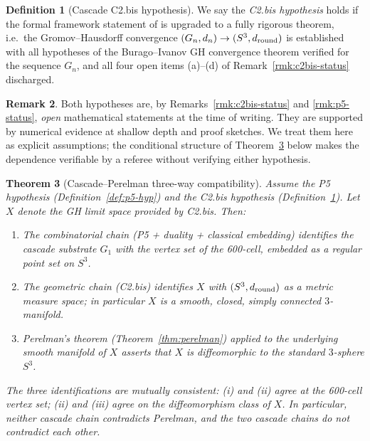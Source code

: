 \documentclass[11pt, a4paper]{amsart}
\newtheorem{theorem}{Theorem}[section]
\theoremstyle{definition}
\newtheorem{definition}[theorem]{Definition}
\newtheorem{remark}[theorem]{Remark}
\begin{document}
\begin{definition}[Cascade C2.bis hypothesis]
\label{def:c2bis-hyp}
We say the \emph{C2.bis hypothesis} holds if the formal framework
statement of \cite[\S C2.bis.1]{CascadeGR} is upgraded to a fully
rigorous theorem, i.e.\ the Gromov--Hausdorff convergence
$(G_{n}, d_{n}) \to (S^{3}, d_{\rm round})$ is established with all
hypotheses of the Burago--Ivanov GH convergence theorem
\cite{BuragoBuragoIvanov} verified for the sequence $G_{n}$, and
all four open items (a)--(d) of Remark~\ref{rmk:c2bis-status}
discharged.
\end{definition}

\begin{remark}
Both hypotheses are, by Remarks~\ref{rmk:c2bis-status} and
\ref{rmk:p5-status}, \emph{open} mathematical statements at the
time of writing. They are supported by numerical evidence at
shallow depth and proof sketches. We treat them here as explicit
assumptions; the conditional structure of
Theorem~\ref{thm:compatibility} below makes the dependence
verifiable by a referee without verifying either hypothesis.
\end{remark}

\begin{theorem}[Cascade--Perelman three-way compatibility]
\label{thm:compatibility}
Assume the P5 hypothesis (Definition~\ref{def:p5-hyp}) and the
C2.bis hypothesis (Definition~\ref{def:c2bis-hyp}). Let $X$ denote
the GH limit space provided by C2.bis. Then:
\begin{enumerate}
\item[(i)] The combinatorial chain (P5 + duality + classical
  embedding) identifies the cascade substrate $G_{1}$ with the
  vertex set of the 600-cell, embedded as a regular point set on
  $S^{3}$.
\item[(ii)] The geometric chain (C2.bis) identifies $X$ with
  $(S^{3}, d_{\rm round})$ as a metric measure space; in particular
  $X$ is a smooth, closed, simply connected $3$-manifold.
\item[(iii)] Perelman's theorem (Theorem~\ref{thm:perelman}) applied
  to the underlying smooth manifold of $X$ asserts that $X$ is
  diffeomorphic to the standard $3$-sphere $S^{3}$.
\end{enumerate}
The three identifications are mutually consistent: (i) and (ii)
agree at the 600-cell vertex set; (ii) and (iii) agree on the
diffeomorphism class of $X$. In particular, neither cascade chain
contradicts Perelman, and the two cascade chains do not contradict
each other.
\end{theorem}
\end{document}
